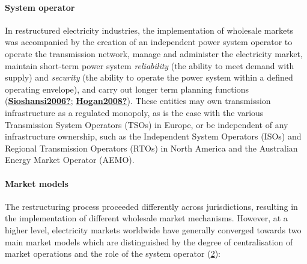 \documentclass[12pt,a4paper,]{report}
\begin{document}
\hypertarget{system-operator}{%
\paragraph{System operator}\label{system-operator}}

In restructured electricity industries, the implementation of wholesale
markets was accompanied by the creation of an independent power system
operator to operate the transmission network, manage and administer the
electricity market, maintain short-term power system \emph{reliability}
(the ability to meet demand with supply) and \emph{security} (the
ability to operate the power system within a defined operating
envelope), and carry out longer term planning functions
(\protect\hyperlink{ref-Sioshansi2006}{\textbf{Sioshansi2006?}};
\protect\hyperlink{ref-Hogan2008}{\textbf{Hogan2008?}}). These entities
may own transmission infrastructure as a regulated monopoly, as is the
case with the various Transmission System Operators (TSOs) in Europe, or
be independent of any infrastructure ownership, such as the Independent
System Operators (ISOs) and Regional Transmission Operators (RTOs) in
North America and the Australian Energy Market Operator (AEMO).

\hypertarget{market-models}{%
\paragraph{Market models}\label{market-models}}

The restructuring process proceeded differently across jurisdictions,
resulting in the implementation of different wholesale market
mechanisms. However, at a higher level, electricity markets worldwide
have generally converged towards two main market models which are
distinguished by the degree of centralisation of market operations and
the role of the system operator
(\protect\hyperlink{fig:market_models}{2}):
\end{document}
